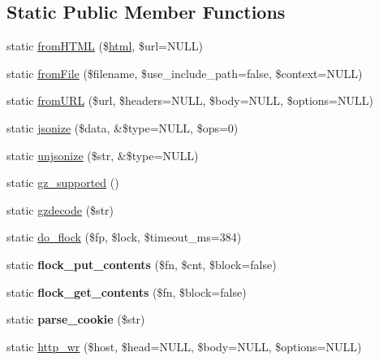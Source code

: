\subsection*{Static Public Member Functions}
\begin{DoxyCompactItemize}
\item 
static \mbox{\hyperlink{classduzun_1_1hQuery_a00c55ba68b55dc033bea74623927ca0f}{from\+H\+T\+ML}} (\$\mbox{\hyperlink{classduzun_1_1hQuery_1_1Node_a6a251f5f93690fabb794c673388dd49b}{html}}, \$url=N\+U\+LL)
\item 
static \mbox{\hyperlink{classduzun_1_1hQuery_a68c406e030e2ccd85707c20c2eedf720}{from\+File}} (\$filename, \$use\+\_\+include\+\_\+path=false, \$context=N\+U\+LL)
\item 
static \mbox{\hyperlink{classduzun_1_1hQuery_a2e7353a5236495ec6c29e68037a86438}{from\+U\+RL}} (\$url, \$headers=N\+U\+LL, \$body=N\+U\+LL, \$options=N\+U\+LL)
\item 
static \mbox{\hyperlink{classduzun_1_1hQuery_a6af08d4cefbb0d2184ff90377f6f757f}{jsonize}} (\$data, \&\$type=N\+U\+LL, \$ops=0)
\item 
static \mbox{\hyperlink{classduzun_1_1hQuery_af5457644a63722ff789fababb88e99c5}{unjsonize}} (\$str, \&\$type=N\+U\+LL)
\item 
static \mbox{\hyperlink{classduzun_1_1hQuery_ad991b9626160044464a687ee32bd61c5}{gz\+\_\+supported}} ()
\item 
static \mbox{\hyperlink{classduzun_1_1hQuery_a84f0b53d5a2ae0e695a49f5b0f85c857}{gzdecode}} (\$str)
\item 
static \mbox{\hyperlink{classduzun_1_1hQuery_a5326810be6da35a2567137787be41ada}{do\+\_\+flock}} (\$fp, \$lock, \$timeout\+\_\+ms=384)
\item 
\mbox{\label{classduzun_1_1hQuery_a8ef4d640cfeb8c0e88b34a056195b53e}} 
static {\bfseries flock\+\_\+put\+\_\+contents} (\$fn, \$cnt, \$block=false)
\item 
\mbox{\label{classduzun_1_1hQuery_a1d63a8628bdf1a94d0600dff9514eca9}} 
static {\bfseries flock\+\_\+get\+\_\+contents} (\$fn, \$block=false)
\item 
\mbox{\label{classduzun_1_1hQuery_a2dc9003ba3cef6852dc4321c63c4ffce}} 
static {\bfseries parse\+\_\+cookie} (\$str)
\item 
static \mbox{\hyperlink{classduzun_1_1hQuery_af3a116011d32dbaa4efe6ff10c0f608f}{http\+\_\+wr}} (\$host, \$head=N\+U\+LL, \$body=N\+U\+LL, \$options=N\+U\+LL)
\end{DoxyCompactItemize}

